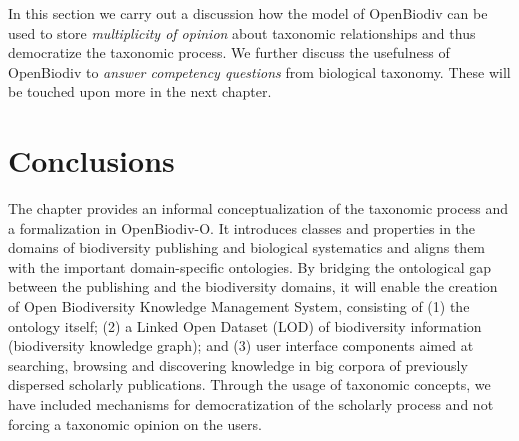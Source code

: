 In this section we carry out a discussion how the model of OpenBiodiv can be used to store \emph{multiplicity of opinion} about taxonomic relationships and thus democratize the taxonomic process. We further discuss the usefulness of OpenBiodiv to \emph{answer competency questions} from biological taxonomy. These will be touched upon more in the next chapter.

\section{Conclusions}

The chapter provides an informal conceptualization of the taxonomic process and a formalization in OpenBiodiv-O. It introduces classes and properties in the domains of biodiversity publishing and biological systematics and aligns them with the important domain-specific ontologies. By bridging the ontological gap between the publishing and the biodiversity domains, it will enable the creation of Open Biodiversity Knowledge Management System, consisting of (1) the ontology itself; (2) a Linked Open Dataset (LOD) of biodiversity information (biodiversity knowledge graph); and (3) user interface components aimed at searching, browsing and discovering knowledge in big corpora of previously dispersed scholarly publications. Through the usage of taxonomic concepts, we have included mechanisms for democratization of the scholarly process and not forcing a taxonomic opinion on the users.